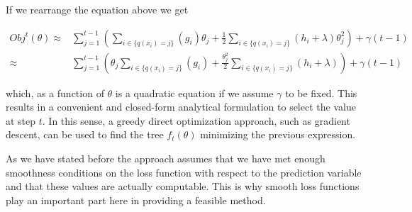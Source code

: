 \begin{appendices}
If we rearrange the equation above we get

\begin{equation}\label{eq:gb-objSteps2}
\begin{split}
Obj^t(\theta) \approx & \sum_{j=1}^{t-1} \left( \sum_{i \in \{q(x_i)=j\}} (g_i )\theta_{j} + \frac{1}{2} \sum_{i \in \{q(x_i)=j\}} (h_i + \lambda ) \theta_{j}^2 \right) + \gamma ({t-1}) \\
\approx & \sum_{j=1}^{t-1} \left( \theta_{j}\sum_{i \in \{q(x_i)=j\}} (g_i ) + \frac{\theta_{j}^2}{2} \sum_{i \in \{q(x_i)=j\}} (h_i + \lambda ) \right) + \gamma ({t-1})
\end{split}
\end{equation}

which, as a function of $\theta$ is a quadratic equation if we assume $\gamma$ to be fixed.
This results in a convenient and closed-form analytical formulation to select the value at step $t$.
In this sense, a greedy direct optimization approach, such as gradient descent, can be used to find the tree $f_t(\theta)$ minimizing the previous expression.

As we have stated before the approach assumes that we have met enough smoothness conditions on the loss function with respect to the prediction variable and that these values are actually computable.
This is why smooth loss functions play an important part here in providing a feasible method.






\end{appendices}
